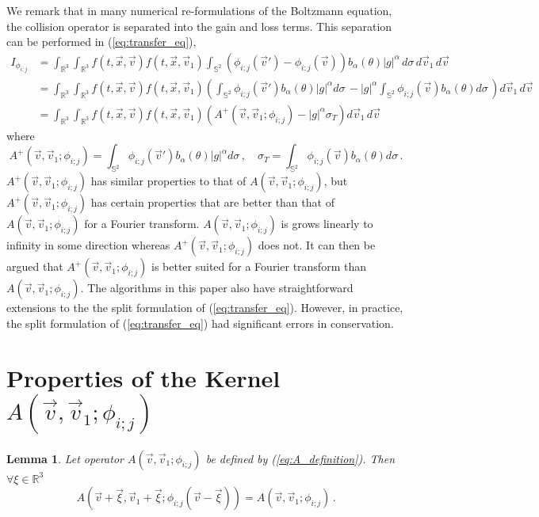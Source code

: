 \documentclass[12pt]{CSUNthesis}
\def\R{\mathbb{R}}
\newtheorem{lemma}{Lemma}
\def\R{\mathbb{R}}
\def\Sbb{\mathbb{S}}
\newcommand{\vecv}{\vec{v}}
\begin{document}
We remark that in many numerical re-formulations of the Boltzmann equation, the collision 
operator is separated into the gain and loss terms.
This separation can be performed in (\ref{eq:transfer_eq}),
\begin{align}
\label{eq:I_split}
I_{\phi_{i;j}}&= \int_{\R^3}\int_{\R^3} f(t,\vec{x},\vec{v}) f(t,\vec{x},\vec{v}_{1})
\int_{\Sbb^2}(\phi_{i;j}(\vec{v}')-\phi_{i;j}(\vec{v})) b_{\alpha}(\theta) |g|^\alpha \, d\sigma\,
 d\vec{v}_{1}\, d\vec{v} \nonumber \\
&= \int_{\R^3}\int_{\R^3} f(t,\vec{x},\vec{v}) f(t,\vec{x},\vec{v}_{1}) (\int_{\Sbb^2}\phi_{i;j}(\vec{v}')b_{\alpha}(\theta) |g|^\alpha d\sigma\, - |g|^\alpha\int_{\Sbb^2}\phi_{i;j}(\vec{v})b_{\alpha}(\theta)  d\sigma\,)  d\vec{v}_{1}\, d\vec{v} \nonumber \\
&= \int_{\R^3}\int_{\R^3} f(t,\vec{x},\vec{v}) f(t,\vec{x},\vec{v}_{1}) (A^+(\vecv,\vecv_1;\phi_{i;j}) - |g|^\alpha \sigma_T)  d\vec{v}_{1}\, d\vec{v}
\end{align}
where
\begin{equation}
\label{eq:A_split}
A^+(\vecv,\vecv_1;\phi_{i;j}) = \int_{\Sbb^2}\phi_{i;j}(\vec{v}')b_{\alpha}(\theta) |g|^\alpha d\sigma\, , \quad \sigma_T = \int_{\Sbb^2}\phi_{i;j}(\vec{v})b_{\alpha}(\theta)  d\sigma\, .
\end{equation}
$A^+(\vecv,\vecv_1;\phi_{i;j})$ has similar properties to that of $A(\vecv,\vecv_1;\phi_{i;j})$, but
$A^+(\vecv,\vecv_1;\phi_{i;j})$ has certain properties that are better than that of $A(\vecv,\vecv_1;\phi_{i;j})$ for a Fourier transform. 
$A(\vecv,\vecv_1;\phi_{i;j})$ is grows linearly to infinity in some direction whereas $A^+(\vecv,\vecv_1;\phi_{i;j})$ does not. It can then be argued that $A^+(\vecv,\vecv_1;\phi_{i;j})$ is better suited for a Fourier transform than $A(\vecv,\vecv_1;\phi_{i;j})$. The algorithms in this paper also have straightforward extensions to the the split formulation of (\ref{eq:transfer_eq}). However, in practice, the split formulation of (\ref{eq:transfer_eq}) had significant errors in conservation.

\section{Properties of the Kernel $A(\vecv,\vecv_1;\phi_{i;j})$}
\label{sec:props_of_a}
\begin{lemma}
\label{lem1} 
Let operator $A(\vec{v},\vec{v}_{1};\phi_{i;j})$ be defined by (\ref{eq:A_definition}). Then $\forall\xi\in \R^3$
\begin{equation*}
A(\vec{v}+\vec{\xi},\vec{v}_{1}+\vec{\xi};\phi_{i;j}(\vec{v}-\vec{\xi}))=
A(\vec{v},\vec{v}_{1};\phi_{i;j}) \, .
\end{equation*}
\end{lemma}
\end{document}
